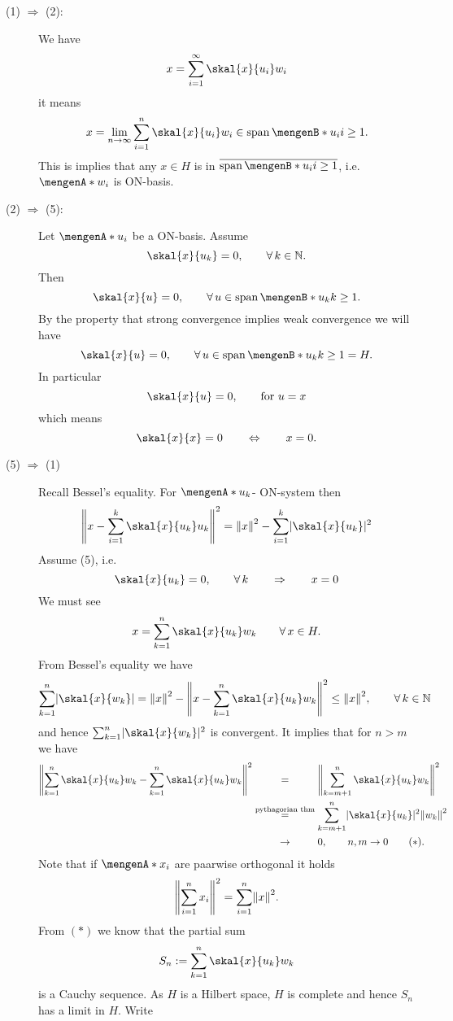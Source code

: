 \begin{beweis}
 	\begin{description}
 		\item[(1) $\Rightarrow $ (2):] We have 
		\[
			x = \sum^{\infty}_{i=1} \skal{x}{u_i}w_i
		\] 
		it means
		\[
			x = \lim_{n \to \infty} \sum^{n}_{i=1} \skal{x}{u_i}w_i \in \spn\set[u_i]{i \geq 1}.
		\]
		This is implies that any $x \in H$ is in $\overline{\spn \set[u_i]{i \geq 1}}$, i.e. $\set{w_i}$ is ON-basis.
		\item[(2) $\Rightarrow$ (5):] Let $\set{u_i}$ be a ON-basis. Assume 
		\[
			\skal{x}{u_k} = 0, \qquad \forall\,  k \in \mathbb{N}.
		\]
		Then
		\[
			\skal{x}{u} = 0, \qquad \forall\, u \in \spn\set[u_k]{k \geq 1}.
		\]
		By the property that strong convergence implies weak convergence we will have 
		\[
			\skal{x}{u}= 0, \qquad \forall\, u \in \spn\set[u_k]{k \geq 1} = H.
		\]
		In particular
		\[
			\skal{x}{u} = 0, \qquad \text{for }u =x
		\]
		which means
		\[
			\skal{x}{x} = 0 \qquad \Leftrightarrow \qquad  x=0.
		\]
		\item[(5) $\Rightarrow$ (1)] Recall Bessel's equality. For $\set{u_k}$- ON-system then 
		\[
			\norm{x- \sum^{k}_{i=1} \skal{x}{u_k}u_k}^2 = \norm{x}^2 - \sum^{k}_{i=1} \abs{\skal{x}{u_k}}^2
		\]
		Assume (5), i.e.
		\[
			\skal{x}{u_k} = 0, \qquad \forall\, k \qquad \Rightarrow \qquad x = 0
		\]
		We must see
		\[
			x = \sum_{k=1}^{n} \skal{x}{u_k}w_k \qquad \forall\, x \in H.
		\]
		From Bessel's equality we have
		\[
			\sum_{k=1}^{n} \abs{\skal{x}{w_k}} = \norm{x}^2 - \norm{x- \sum_{k=1}^{n} \skal{x}{u_k}w_k}^2 \leq \norm{x}^2, \qquad \forall\, k \in \mathbb{N}
		\]
		and hence $\sum_{k=1}^{n}\abs{\skal{x}{w_k}}^2$ is convergent. It implies that for $n>m$ we have
		\begin{align*}
			\norm{\sum_{k=1}^{n}\skal{x}{u_k}w_k - \sum_{k=1}^{n} \skal{x}{u_k}w_k}^2 
			&\stackrel{\hphantom{\text{pythagorian thm}}}{=} \norm{\sum_{k=m+1}^{n} \skal{x}{u_k}w_k}^2 \\
			&\stackrel{\text{pythagorian thm}}{=} \sum_{k=m+1}^{n} \abs{\skal{x}{u_k}}^2 \norm{w_k}^2 \\
			&\stackrel{\hphantom{\text{pythagorian thm}}}{\to } 0, \qquad n,m \to 0 \qquad (*).
		\end{align*}
		Note that if $\set{x_i}$ are paarwise orthogonal it holds
		\[
			\norm{\sum^{n}_{i=1}x_i}^2 = \sum^{n}_{i=1} \norm{x}^2.
		\]
		From $(*)$ we know that the partial sum
		\[
			S_n := \sum_{k=1}^{n}\skal{x}{u_k}w_k
		\]
		is a Cauchy sequence. As $H$ is a Hilbert space, $H$ is complete and hence $S_n$ has a limit in $H$. Write

\end{description}
\end{beweis}
